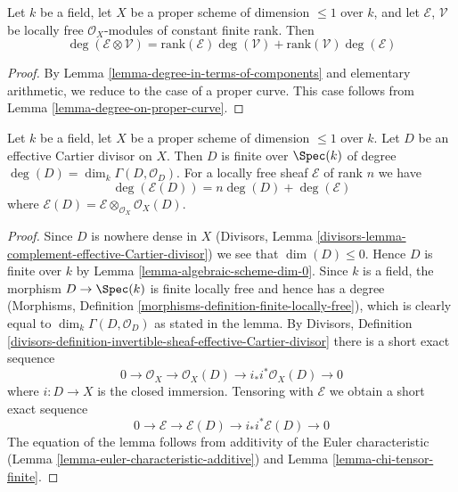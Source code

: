 \begin{lemma}
\label{lemma-degree-tensor-product}
Let $k$ be a field, let $X$ be a proper scheme of dimension $\leq 1$
over $k$, and let $\mathcal{E}$, $\mathcal{V}$ be locally free
$\mathcal{O}_X$-modules of constant finite rank. Then
$$
\deg(\mathcal{E} \otimes \mathcal{V}) =
\text{rank}(\mathcal{E}) \deg(\mathcal{V}) +
\text{rank}(\mathcal{V}) \deg(\mathcal{E})
$$
\end{lemma}

\begin{proof}
By Lemma \ref{lemma-degree-in-terms-of-components} and elementary
arithmetic, we reduce to the case of a proper curve.
This case follows from Lemma \ref{lemma-degree-on-proper-curve}.
\end{proof}

\begin{lemma}
\label{lemma-degree-effective-Cartier-divisor}
Let $k$ be a field, let $X$ be a proper scheme of dimension $\leq 1$
over $k$. Let $D$ be an effective Cartier divisor on $X$.
Then $D$ is finite over $\Spec(k)$ of degree
$\deg(D) = \dim_k \Gamma(D, \mathcal{O}_D)$. For a locally free sheaf
$\mathcal{E}$ of rank $n$ we have
$$
\deg(\mathcal{E}(D)) = n\deg(D) + \deg(\mathcal{E})
$$
where $\mathcal{E}(D) = \mathcal{E} \otimes_{\mathcal{O}_X} \mathcal{O}_X(D)$.
\end{lemma}

\begin{proof}
Since $D$ is nowhere dense in $X$ (Divisors, Lemma
\ref{divisors-lemma-complement-effective-Cartier-divisor})
we see that $\dim(D) \leq 0$. Hence $D$ is finite over $k$
by Lemma \ref{lemma-algebraic-scheme-dim-0}. Since $k$ is a field,
the morphism $D \to \Spec(k)$ is finite locally free and hence has
a degree
(Morphisms, Definition \ref{morphisms-definition-finite-locally-free}),
which is clearly equal to $\dim_k \Gamma(D, \mathcal{O}_D)$
as stated in the lemma. By
Divisors, Definition
\ref{divisors-definition-invertible-sheaf-effective-Cartier-divisor}
there is a short exact sequence
$$
0 \to \mathcal{O}_X \to \mathcal{O}_X(D) \to i_*i^*\mathcal{O}_X(D) \to 0
$$
where $i : D \to X$ is the closed immersion. Tensoring with $\mathcal{E}$
we obtain a short exact sequence
$$
0 \to \mathcal{E} \to \mathcal{E}(D) \to i_*i^*\mathcal{E}(D) \to 0
$$
The equation of the lemma follows from additivity of
the Euler characteristic (Lemma \ref{lemma-euler-characteristic-additive})
and Lemma \ref{lemma-chi-tensor-finite}.
\end{proof}

